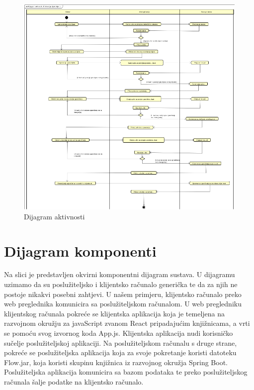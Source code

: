 		\begin{figure}
			\centering
			\includegraphics[scale=0.8]{dijagrami/Dijagram_Aktivnosti}
			\caption{Dijagram aktivnosti}
		\end{figure}
		
		\eject
		\newpage
		\section{Dijagram komponenti}
		
		Na slici je predstavljen okvirni komponentni dijagram sustava. U dijagramu uzimamo da su poslužiteljsko i klijentsko računalo generička te da za njih ne postoje nikakvi posebni zahtjevi. U našem primjeru, klijentsko računalo preko web preglednika komunicira sa poslužiteljskom računalom. U web pregledniku klijentskog računala pokreće se klijentska aplikacija koja je temeljena na razvojnom okružju za javaScript zvanom React pripadajućim knjižnicama, a vrti se pomoću svog izvornog koda App.js. Klijentska aplikacija nudi korisničko sučelje poslužiteljskoj aplikaciji. Na poslužiteljskom računalu s druge strane, pokreće se poslužiteljska aplikacija koja za svoje pokretanje koristi datoteku Flow.jar, koja koristi skupinu knjižnica iz razvojnog okružja Spring Boot. Poslužiteljska aplikacija komunicira sa bazom podataka te preko poslužiteljskog računala šalje podatke na klijentsko računalo.
		
